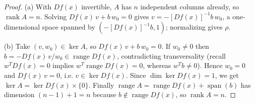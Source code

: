 \documentclass[11pt,american]{article}
\DeclareMathOperator{\rank}{\operatorname{rank}}
\DeclareMathOperator{\range}{range}
\DeclareMathOperator{\spanop}{span}
\theoremstyle{definition}
\theoremstyle{plain}
\theoremstyle{remark}
\begin{document}
\begin{proof}
(a) With $Df(x)$ invertible, $A$ has $n$ independent columns already, so $\rank A = n$. Solving $Df(x)\,v + b\,w_0 = 0$ gives $v = -[Df(x)]^{-1} b\, w_0$, a one-dimensional space spanned by $(-[Df(x)]^{-1}b, 1)$; normalizing gives $\rho$.

(b) Take $(v, w_0) \in \ker A$, so $Df(x)\,v + b\,w_0 = 0$. If $w_0 \ne 0$ then $b = -Df(x)\,v / w_0 \in \range Df(x)$, contradicting transversality (recall $w^T Df(x) = 0$ implies $w^T \range Df(x) = 0$, whereas $w^T b \ne 0$). Hence $w_0 = 0$ and $Df(x)\,v = 0$, i.e. $v \in \ker Df(x)$. Since $\dim \ker Df(x) = 1$, we get $\ker A = \ker Df(x) \times \{0\}$. Finally $\range A = \range Df(x) + \spanop(b)$ has dimension $(n-1) + 1 = n$ because $b \notin \range Df(x)$, so $\rank A = n$.
\end{proof}
\end{document}
